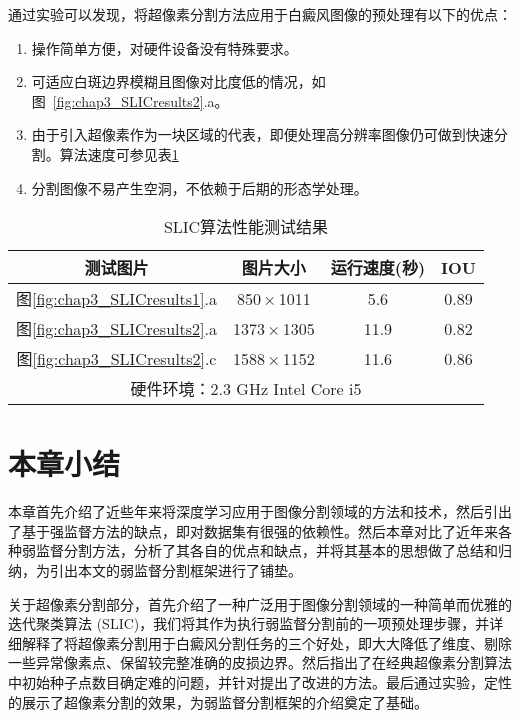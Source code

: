 通过实验可以发现，将超像素分割方法应用于白癜风图像的预处理有以下的优点：
\begin{enumerate}
\item 操作简单方便，对硬件设备没有特殊要求。
\item 可适应白斑边界模糊且图像对比度低的情况，如图~\ref{fig:chap3_SLICresults2}.a。
\item 由于引入超像素作为一块区域的代表，即便处理高分辨率图像仍可做到快速分割。算法速度可参见表\ref{table:SLICresults}
\item 分割图像不易产生空洞，不依赖于后期的形态学处理。
\end{enumerate}

\begin{table}[]
\centering
\caption{SLIC算法性能测试结果}
\begin{tabular}{cccc}
\toprule
测试图片 & 图片大小         & 运行速度(秒) & IOU  \\ \midrule
  图\ref{fig:chap3_SLICresults1}.a   & 850 × 1011   & 5.6     & 0.89 \\
    图\ref{fig:chap3_SLICresults2}.a   & 1373 × 1305 & 11.9    & 0.82 \\
    图\ref{fig:chap3_SLICresults2}.c   & 1588 × 1152 & 11.6    & 0.86 \\ \midrule
     \multicolumn{4}{c}{硬件环境：2.3 GHz Intel Core i5}\\
     \bottomrule
\end{tabular}
\label{table:SLICresults}
\end{table}

\section{本章小结}
本章首先介绍了近些年来将深度学习应用于图像分割领域的方法和技术，然后引出了基于强监督方法的缺点，即对数据集有很强的依赖性。然后本章对比了近年来各种弱监督分割方法，分析了其各自的优点和缺点，并将其基本的思想做了总结和归纳，为引出本文的弱监督分割框架进行了铺垫。

关于超像素分割部分，首先介绍了一种广泛用于图像分割领域的一种简单而优雅的迭代聚类算法 (SLIC)，我们将其作为执行弱监督分割前的一项预处理步骤，并详细解释了将超像素分割用于白癜风分割任务的三个好处，即大大降低了维度、剔除一些异常像素点、保留较完整准确的皮损边界。然后指出了在经典超像素分割算法中初始种子点数目确定难的问题，并针对提出了改进的方法。最后通过实验，定性的展示了超像素分割的效果，为弱监督分割框架的介绍奠定了基础。

